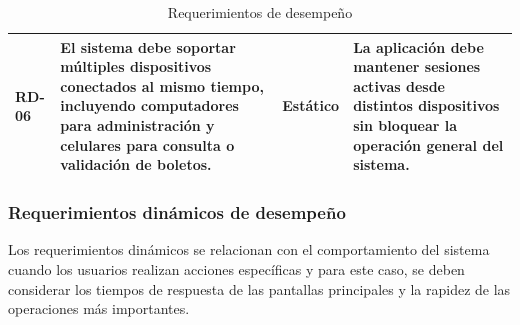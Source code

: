 \documentclass[12pt,letterpaper]{article}
\begin{document}
\begin{table}[H]
\begin{tabularx}{\textwidth}{|p{1.3cm}|X|p{1.5cm}|X|}
\textbf{RD-06} & 
El sistema debe soportar múltiples dispositivos conectados al mismo tiempo, incluyendo computadores para administración y celulares para consulta o validación de boletos. & 
Estático & 
La aplicación debe mantener sesiones activas desde distintos dispositivos sin bloquear la operación general del sistema. \\ \hline

\end{tabularx}

\caption{Requerimientos de desempeño}
\label{tab:requerimientos_desempeno}
\normalsize
\end{table}

\subsubsection{Requerimientos dinámicos de desempeño}
Los requerimientos dinámicos se relacionan con el comportamiento del sistema cuando los usuarios realizan acciones específicas y para este caso, se deben considerar los tiempos de respuesta de las pantallas principales y la rapidez de las operaciones más importantes.
\end{document}
